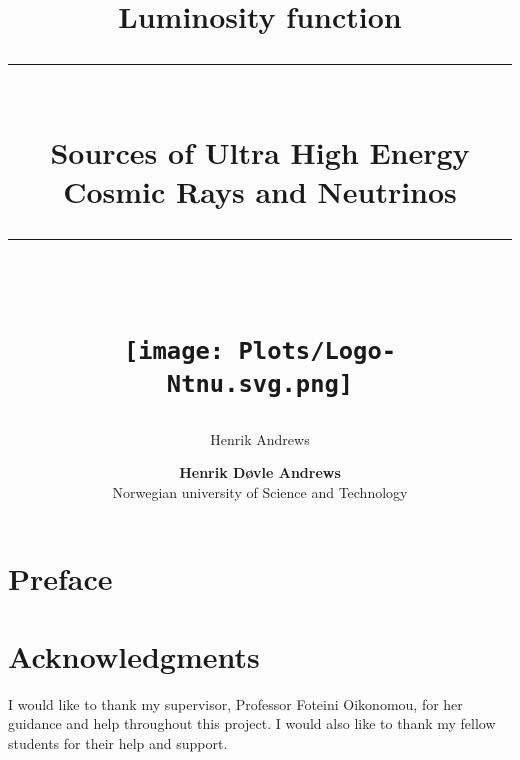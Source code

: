 \documentclass[]{article}
\title{Luminosity function}
\author{Henrik Andrews}
\newcommand{\HRule}[1]{\rule{\linewidth}{#1}}
\begin{document}
\title{ \normalsize
	\HRule{0.5pt} \\
	\LARGE \textbf{{Sources of Ultra High Energy Cosmic Rays and Neutrinos}}	
	\\
	\HRule{2pt} \\ [0.5cm]		
	\vspace{6cm}
	\begin{figure}[htp]
    \centering
    \texttt{[image: Plots/Logo-Ntnu.svg.png]}
    \end{figure}
}

\author{
    \normalsize 
	\textbf{Henrik Døvle Andrews } \\
	Norwegian university of Science and Technology \\ 
}

\maketitle
\setcounter{page}{ 0 }

\newpage

\pagestyle{fancy}
\fancyhf{}
\setlength\headheight{14pt}
\fancyhead[R]{\leftmark}
\setcounter{page}{1}


\maketitle
\section*{Preface}
\lipsum[1]


\begin{abstract}
\lipsum[1]

\end{abstract}

\newpage 
\section*{Acknowledgments}
I would like to thank my supervisor, Professor Foteini Oikonomou, for her guidance and help throughout this project. I would also like to thank my fellow students for their help and support. \cite{Balasubramaniam_2021}

\newpage
\tableofcontents

\newpage
\listoffigures

\listoftables


\newpage



\newpage 


\newpage

\newpage

\newpage

\newpage

\newpage

\newpage

\newpage
\printbibliography
\end{document}
